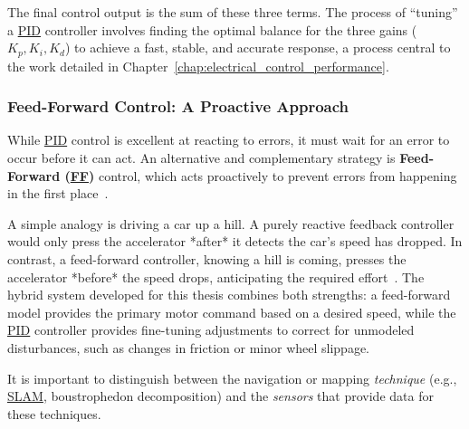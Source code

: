 The final control output is the sum of these three terms. The process of ``tuning'' a \hyperref[term:pid]{PID} controller involves finding the optimal balance for the three gains ($K_p, K_i, K_d$) to achieve a fast, stable, and accurate response, a process central to the work detailed in Chapter~\ref{chap:electrical_control_performance}.

\subsubsection{Feed-Forward Control: A Proactive Approach}
\label{subsubsec:ff_principles}
While \hyperref[term:pid]{PID} control is excellent at reacting to errors, it must wait for an error to occur before it can act. An alternative and complementary strategy is \textbf{Feed-Forward (\hyperref[term:ff]{FF})} control, which acts proactively to prevent errors from happening in the first place~\cite{ref_ffwd_analogy}.

A simple analogy is driving a car up a hill. A purely reactive feedback controller would only press the accelerator *after* it detects the car's speed has dropped. In contrast, a feed-forward controller, knowing a hill is coming, presses the accelerator *before* the speed drops, anticipating the required effort~\cite{ref_ffwd_analogy}. The hybrid system developed for this thesis combines both strengths: a feed-forward model provides the primary motor command based on a desired speed, while the \hyperref[term:pid]{PID} controller provides fine-tuning adjustments to correct for unmodeled disturbances, such as changes in friction or minor wheel slippage.

It is important to distinguish between the navigation or mapping \textit{technique} (e.g., \hyperref[term:slam]{SLAM}, boustrophedon decomposition) and the \textit{sensors} that provide data for these techniques.

